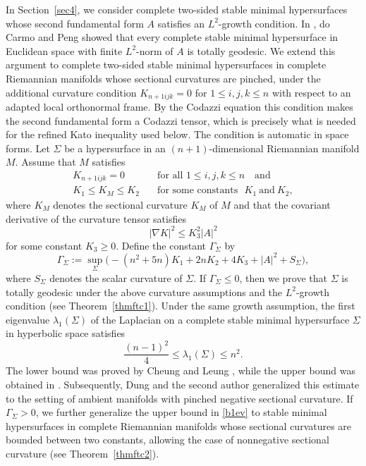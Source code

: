 \documentclass[amssymb,amstex,amsmath,11pt]{article}
\numberwithin{equation}{section}
\theoremstyle{plain}
\theoremstyle{definition}
\theoremstyle{remark}
\begin{document}
In Section~\ref{sec4}, we consider complete two-sided stable minimal hypersurfaces whose second fundamental form $A$ satisfies an $L^2$-growth condition. In \cite{CP80}, do Carmo and Peng showed that every complete stable minimal hypersurface in Euclidean space with finite $L^2$-norm of $A$ is totally geodesic. We extend this argument to complete two-sided stable minimal hypersurfaces in complete Riemannian manifolds whose sectional curvatures are pinched, under the additional curvature condition $K_{n+1ijk}=0$ for $1\le i,j,k\le n$ with respect to an adapted local orthonormal frame. By the Codazzi equation this condition makes the second fundamental form a Codazzi tensor, which is precisely what is needed for the refined Kato inequality used below. The condition is automatic in space forms. Let $\Sigma$ be a hypersurface in an $(n+1)$-dimensional Riemannian manifold $M$. Assume that $M$ satisfies
\begin{align*}
K_{n+1ijk}=0 &\quad\text{for all } 1\leq i,j,k\leq n \quad\text{and} \\
K_1\leq K_M\leq K_2 &\quad\text{for some constants~~} K_1 ~\text{and}~ K_2,
\end{align*}
where $K_M$ denotes the sectional curvature $K_M$ of $M$ and that the covariant derivative of the curvature tensor satisfies
$$
|\nabla K|^2\le K_3^2|A|^2
$$
for some constant $K_3\ge 0$. Define the constant $\Gamma_\Sigma$ by
$$
\Gamma_\Sigma
:=
\sup_\Sigma \bigl(-(n^2+5n)K_1+2nK_2+4K_3+|A|^2+S_\Sigma\bigr),
$$
where $S_\Sigma$ denotes the scalar curvature of $\Sigma$. If $\Gamma_\Sigma\le 0$, then we prove that $\Sigma$ is totally geodesic under the above curvature assumptions and the $L^2$-growth condition (see Theorem~\ref{thmftc1}).  Under the same growth assumption, the first eigenvalue $\lambda_1(\Sigma)$ of the Laplacian on a complete stable minimal hypersurface $\Sigma$ in hyperbolic space satisfies
\begin{equation} \label{b1ev}
\frac{(n-1)^2}{4} \leq \lambda_1(\Sigma) \leq n^2.
\end{equation}
The lower bound was proved by Cheung and Leung \cite{C&L01}, while the upper bound was obtained in \cite{Seo11}. Subsequently, Dung and the second author \cite{D&S12} generalized this estimate to the setting of ambient manifolds with pinched negative sectional curvature. If $\Gamma_\Sigma > 0$, we further generalize the upper bound in \eqref{b1ev} to stable minimal hypersurfaces in complete Riemannian manifolds whose sectional curvatures are bounded between two constants, allowing the case of nonnegative sectional curvature (see Theorem~\ref{thmftc2}).
\end{document}
